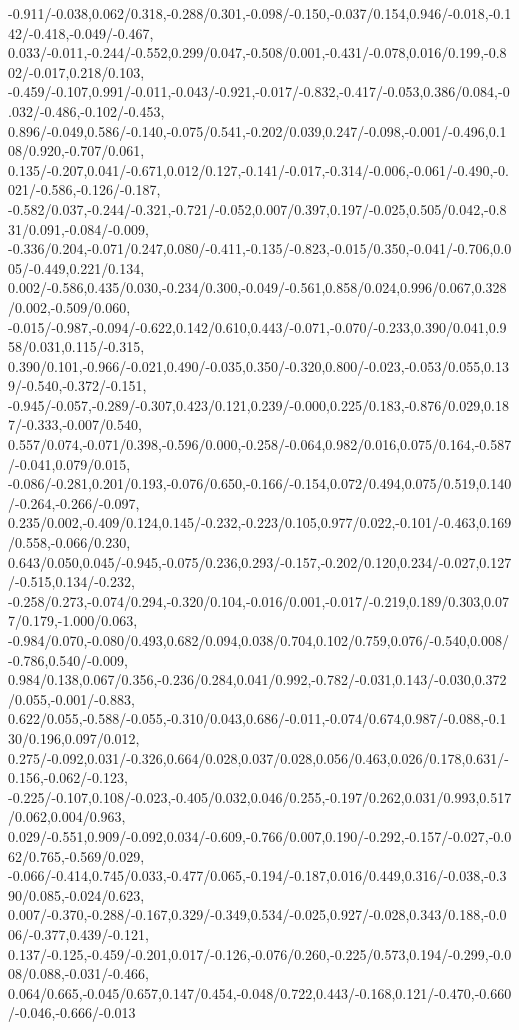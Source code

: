 {-0.911/-0.038,0.062/0.318,-0.288/0.301,-0.098/-0.150,-0.037/0.154,0.946/-0.018,-0.142/-0.418,-0.049/-0.467,%
0.033/-0.011,-0.244/-0.552,0.299/0.047,-0.508/0.001,-0.431/-0.078,0.016/0.199,-0.802/-0.017,0.218/0.103,%
-0.459/-0.107,0.991/-0.011,-0.043/-0.921,-0.017/-0.832,-0.417/-0.053,0.386/0.084,-0.032/-0.486,-0.102/-0.453,%
0.896/-0.049,0.586/-0.140,-0.075/0.541,-0.202/0.039,0.247/-0.098,-0.001/-0.496,0.108/0.920,-0.707/0.061,%
0.135/-0.207,0.041/-0.671,0.012/0.127,-0.141/-0.017,-0.314/-0.006,-0.061/-0.490,-0.021/-0.586,-0.126/-0.187,%
-0.582/0.037,-0.244/-0.321,-0.721/-0.052,0.007/0.397,0.197/-0.025,0.505/0.042,-0.831/0.091,-0.084/-0.009,%
-0.336/0.204,-0.071/0.247,0.080/-0.411,-0.135/-0.823,-0.015/0.350,-0.041/-0.706,0.005/-0.449,0.221/0.134,%
0.002/-0.586,0.435/0.030,-0.234/0.300,-0.049/-0.561,0.858/0.024,0.996/0.067,0.328/0.002,-0.509/0.060,%
-0.015/-0.987,-0.094/-0.622,0.142/0.610,0.443/-0.071,-0.070/-0.233,0.390/0.041,0.958/0.031,0.115/-0.315,%
0.390/0.101,-0.966/-0.021,0.490/-0.035,0.350/-0.320,0.800/-0.023,-0.053/0.055,0.139/-0.540,-0.372/-0.151,%
-0.945/-0.057,-0.289/-0.307,0.423/0.121,0.239/-0.000,0.225/0.183,-0.876/0.029,0.187/-0.333,-0.007/0.540,%
0.557/0.074,-0.071/0.398,-0.596/0.000,-0.258/-0.064,0.982/0.016,0.075/0.164,-0.587/-0.041,0.079/0.015,%
-0.086/-0.281,0.201/0.193,-0.076/0.650,-0.166/-0.154,0.072/0.494,0.075/0.519,0.140/-0.264,-0.266/-0.097,%
0.235/0.002,-0.409/0.124,0.145/-0.232,-0.223/0.105,0.977/0.022,-0.101/-0.463,0.169/0.558,-0.066/0.230,%
0.643/0.050,0.045/-0.945,-0.075/0.236,0.293/-0.157,-0.202/0.120,0.234/-0.027,0.127/-0.515,0.134/-0.232,%
-0.258/0.273,-0.074/0.294,-0.320/0.104,-0.016/0.001,-0.017/-0.219,0.189/0.303,0.077/0.179,-1.000/0.063,%
-0.984/0.070,-0.080/0.493,0.682/0.094,0.038/0.704,0.102/0.759,0.076/-0.540,0.008/-0.786,0.540/-0.009,%
0.984/0.138,0.067/0.356,-0.236/0.284,0.041/0.992,-0.782/-0.031,0.143/-0.030,0.372/0.055,-0.001/-0.883,%
0.622/0.055,-0.588/-0.055,-0.310/0.043,0.686/-0.011,-0.074/0.674,0.987/-0.088,-0.130/0.196,0.097/0.012,%
0.275/-0.092,0.031/-0.326,0.664/0.028,0.037/0.028,0.056/0.463,0.026/0.178,0.631/-0.156,-0.062/-0.123,%
-0.225/-0.107,0.108/-0.023,-0.405/0.032,0.046/0.255,-0.197/0.262,0.031/0.993,0.517/0.062,0.004/0.963,%
0.029/-0.551,0.909/-0.092,0.034/-0.609,-0.766/0.007,0.190/-0.292,-0.157/-0.027,-0.062/0.765,-0.569/0.029,%
-0.066/-0.414,0.745/0.033,-0.477/0.065,-0.194/-0.187,0.016/0.449,0.316/-0.038,-0.390/0.085,-0.024/0.623,%
0.007/-0.370,-0.288/-0.167,0.329/-0.349,0.534/-0.025,0.927/-0.028,0.343/0.188,-0.006/-0.377,0.439/-0.121,%
0.137/-0.125,-0.459/-0.201,0.017/-0.126,-0.076/0.260,-0.225/0.573,0.194/-0.299,-0.008/0.088,-0.031/-0.466,%
0.064/0.665,-0.045/0.657,0.147/0.454,-0.048/0.722,0.443/-0.168,0.121/-0.470,-0.660/-0.046,-0.666/-0.013%
}

